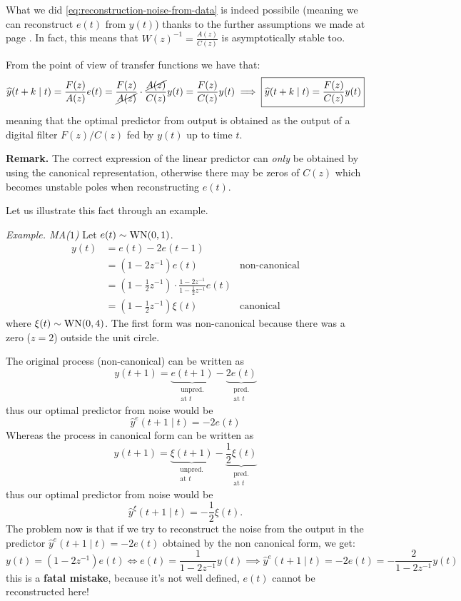
What we did \eqref{eq:reconstruction-noise-from-data} is indeed possibile (meaning we can reconstruct $e(t)$ from $y(t)$) thanks to the further assumptions we made at page \pageref{assumptions-prediction-theory}. In fact, this means that $W(z)^{-1}=\frac{A(z)}{C(z)}$ is asymptotically stable too.

From the point of view of transfer functions we have that:
\[
	\hat y (t+k\mid t) = \frac{F(z)}{A(z)}e(t) =\frac{F(z)}{\cancel{A(z)}}\cdot\frac{\cancel{A(z)}}{C(z)}y(t) =\frac{F(z)}{C(z)}y(t) \implies \boxed{\hat y (t+k\mid t) = \frac{F(z)}{C(z)}y(t)}
\]
meaning that the optimal predictor from output is obtained as the output of a digital filter $F(z)/C(z)$ fed by $y(t)$ up to time $t$.

\textbf{Remark.}
The correct expression of the linear predictor can \emph{only} be obtained by using the canonical representation, otherwise there may be zeros of $C(z)$ which becomes unstable poles when reconstructing $e(t)$.

Let us illustrate this fact through an example.

\emph{Example. MA($1$)}
Let $e(t)\sim \WN(0,1)$.
\begin{align*}
	y(t) &= e(t) - 2 e(t-1)\\
	&= (1-2z^{-1} )e(t) &\text{non-canonical}\\
	&=\left( 1-\frac{1}{2} z^{-1}  \right) \cdot\frac{1-2z^{-1}}{1-\frac{1}{2} z^{-1}} e(t)\\
	&=\left( 1-\frac{1}{2} z^{-1}  \right) \xi(t) &\text{canonical}
\end{align*}
where $\xi(t)\sim \WN(0,4)$. The first form was non-canonical because there was a zero ($z=2$) outside the unit circle.

The original process (non-canonical) can be written as
\[
	y(t+1)=\underbrace{e(t+1)}_{\substack{\text{unpred.}\\\text{at $t$}}}-\underbrace{2e(t)}_{\substack{\text{pred.}\\\text{at $t$}}}
\]
thus our optimal predictor from noise would be
\[
	\hat y^{e} (t+1\mid t) = -2e(t)
\]
Whereas the process in canonical form can be written as 
\[
	y(t+1) =\underbrace{\xi(t+1)}_{\substack{\text{unpred.}\\\text{at $t$}}}-\underbrace{\frac{1}{2} \xi(t)}_{\substack{\text{pred.}\\\text{at $t$}}}
\]
thus our optimal predictor from noise would be
\[
	\hat y^{\xi} (t+1\mid t)=-\frac{1}{2} \xi(t).
\]
The problem now is that if we try to reconstruct the noise from the output in the predictor $\hat y^{e} (t+1\mid t) = -2e(t)$ obtained by the non canonical form, we get:
\[
	y(t)=(1-2z^{-1})e(t) \iff e(t) =\frac{1}{1-2z^{-1}} y(t) \implies \hat y^{e} (t+1\mid t) = -2e(t) = -\frac{2}{1-2z^{-1}}y(t)
\]
this is a \textbf{fatal mistake}, because it's not well defined, $e(t)$ cannot be reconstructed here!

